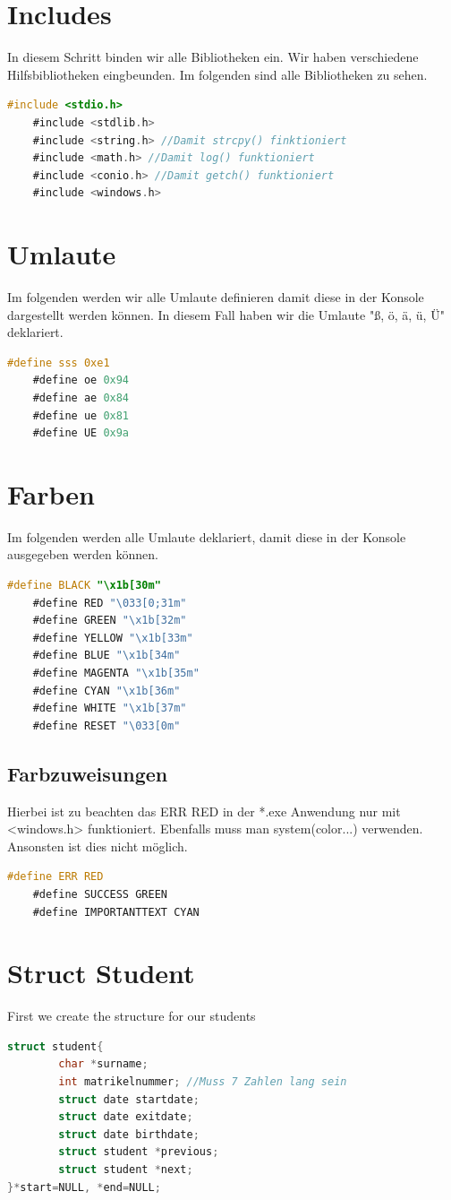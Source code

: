\documentclass[a4paper, 11pt, oneside]{book} %
\begin{document}
\section{Includes}
In diesem Schritt binden wir alle Bibliotheken ein. Wir haben verschiedene Hilfsbibliotheken eingbeunden. Im folgenden sind alle Bibliotheken zu sehen.
\begin{lstlisting}[language=C]
	#include <stdio.h>
	#include <stdlib.h>
	#include <string.h> //Damit strcpy() finktioniert
	#include <math.h> //Damit log() funktioniert
	#include <conio.h> //Damit getch() funktioniert
	#include <windows.h>	
\end{lstlisting}
\section{Umlaute}
Im folgenden werden wir alle Umlaute definieren damit diese in der Konsole dargestellt werden können. In diesem Fall haben wir die Umlaute "ß, ö, ä, ü, Ü" deklariert.
\begin{lstlisting}[language=C]
	#define sss 0xe1 
	#define oe 0x94 
	#define ae 0x84 
	#define ue 0x81 
	#define UE 0x9a
\end{lstlisting}

\section{Farben}
Im folgenden werden alle Umlaute deklariert, damit diese in der Konsole ausgegeben werden können.
\begin{lstlisting}[language=C]
	#define BLACK "\x1b[30m"
	#define RED "\033[0;31m"
	#define GREEN "\x1b[32m"
	#define YELLOW "\x1b[33m"
	#define BLUE "\x1b[34m"
	#define MAGENTA "\x1b[35m"
	#define CYAN "\x1b[36m"
	#define WHITE "\x1b[37m"
	#define RESET "\033[0m"
\end{lstlisting}
\subsection{Farbzuweisungen}
Hierbei ist zu beachten das ERR RED in der *.exe Anwendung nur mit <windows.h> funktioniert. Ebenfalls muss man system(color...) verwenden. Ansonsten ist dies nicht möglich.

\begin{lstlisting}[language=C]
	#define ERR RED
	#define SUCCESS GREEN
	#define IMPORTANTTEXT CYAN
\end{lstlisting}

\section{Struct Student}
 First we create the structure for our students
\begin{lstlisting}[language=C]
	struct student{
    	char *surname;
    	int matrikelnummer; //Muss 7 Zahlen lang sein
    	struct date startdate;
    	struct date exitdate;
    	struct date birthdate;
    	struct student *previous;
    	struct student *next;
}*start=NULL, *end=NULL;
\end{lstlisting}
\end{document}
